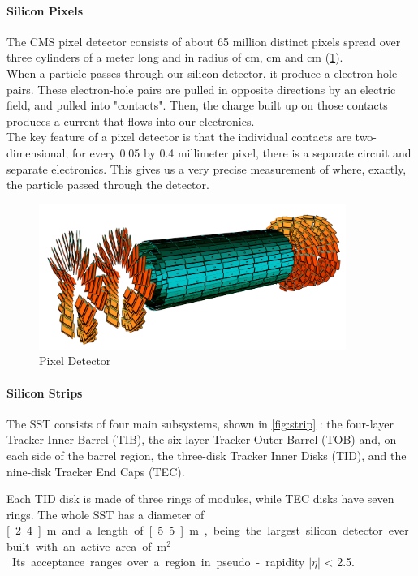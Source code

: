 \paragraph{Silicon Pixels} The CMS pixel detector consists of about 65 million distinct pixels spread over three cylinders of a meter long and in radius of \unit[4]{cm}, \unit[7]{cm} and \unit[10]{cm} (\cref{fig:pixel}).\\
\indent
When a particle passes through our silicon detector, it produce a electron-hole pairs. These electron-hole pairs are pulled in opposite directions by an electric field, and pulled into "contacts". Then, the charge built up on those contacts produces a current that flows into our electronics.\\
\indent 
The key feature of a pixel detector is that the individual contacts are two-dimensional; for every 0.05 by 0.4 millimeter pixel, there is a separate circuit and separate electronics. This gives us a very precise measurement of where, exactly, the particle passed through the detector.
\begin{figure}[H]
  \centering
\includegraphics[width=10cm]{CMS_chapter_plots/pixel2}
  \caption{Pixel Detector \label{fig:pixel}}
\end{figure}

\paragraph{Silicon Strips}

The SST consists of four main subsystems, shown in \cref{fig:strip}
: the four-layer Tracker Inner Barrel (TIB), the six-layer Tracker Outer Barrel (TOB) and, on each side of the barrel region, the three-disk Tracker Inner Disks (TID), and the nine-disk Tracker End Caps (TEC).

Each TID disk is made of three rings of modules, while TEC disks have seven rings. The whole SST has a diameter of \unit[2.4]{m} and a length of \unit[5.5]{m}, being the largest silicon detector ever built with an active area of \unit[198]{m$^{2}$}. Its acceptance ranges over a region in pseudo-rapidity $\left| \eta\right|$ < 2.5.

